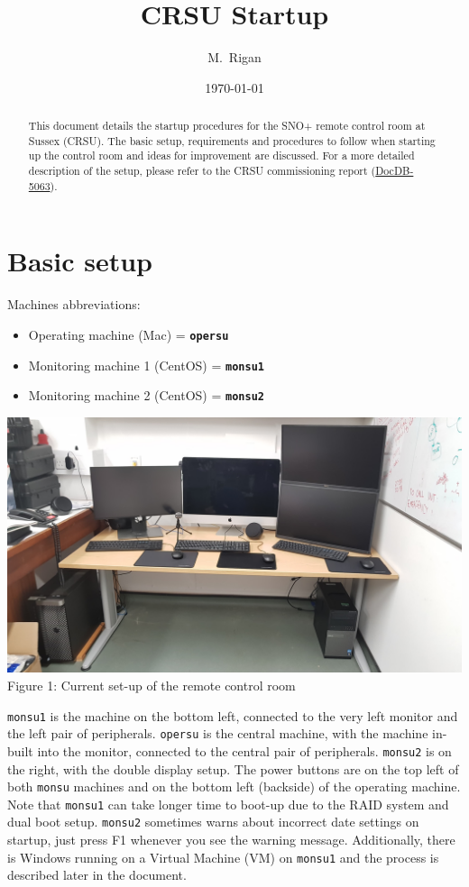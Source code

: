 \documentclass[12pt, oneside, a4paper]{article}
\title{CRSU Startup}
\author{M.\ Rigan}
\affil{MPS, University of Sussex}
\date{\today}
\begin{document}
\maketitle
\begin{abstract}
	This document details the startup procedures for the SNO+ remote control room at Sussex (CRSU). The basic setup, requirements and procedures to follow when starting up the control room and ideas for improvement are discussed. For a more detailed description of the setup, please refer to the CRSU commissioning report (\href{https://www.snolab.ca/snoplus/private/DocDB/cgi/ShowDocument?docid=5063}{DocDB-5063}).
\end{abstract}
\clearpage
\tableofcontents
\clearpage

\section{Basic setup}
Machines abbreviations:
\begin{itemize}
	\item Operating machine (Mac) = \textbf{\tt opersu}
	\item Monitoring machine 1 (CentOS) = \textbf{\tt monsu1}
	\item Monitoring machine 2 (CentOS) = \textbf{\tt monsu2}
\end{itemize}
\begin{center}
\includegraphics[width=1\textwidth]{figures/set_up.jpg} Figure 1: Current set-up of the remote control room
\end{center}

{\tt monsu1} is the machine on the bottom left, connected to the very left monitor and the left pair of peripherals. {\tt opersu} is the central machine, with the machine in-built into the monitor, connected to the central pair of peripherals. {\tt monsu2} is on the right, with the double display setup. The power buttons are on the top left of both {\tt monsu} machines and on the bottom left (backside) of the operating machine. Note that {\tt monsu1} can take longer time to boot-up due to the RAID system and dual boot setup. {\tt monsu2} sometimes warns about incorrect date settings on startup, just press F1 whenever you see the warning message. Additionally, there is Windows running on a Virtual Machine (VM) on {\tt monsu1} and the process is described later in the document.
\end{document}
